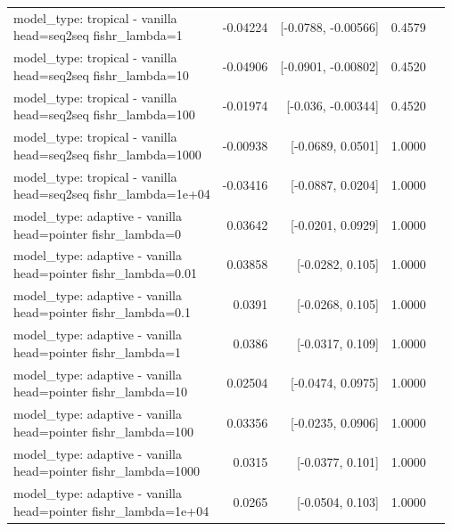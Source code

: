\documentclass[10pt]{article}
\makeatletter
\newcommand{\stackcell}[1]{\begin{tabular}[t]{@{}l@{}}#1\end{tabular}}
\makeatother
\begin{document}
{\begin{longtable}{lrrrl}
\stackcell{model\_type: tropical - vanilla\\\footnotesize head=seq2seq fishr\_lambda=1 } & -0.04224 & [-0.0788, -0.00566] & 0.4579 & \\
\stackcell{model\_type: tropical - vanilla\\\footnotesize head=seq2seq fishr\_lambda=10 } & -0.04906 & [-0.0901, -0.00802] & 0.4520 & \\
\stackcell{model\_type: tropical - vanilla\\\footnotesize head=seq2seq fishr\_lambda=100 } & -0.01974 & [-0.036, -0.00344] & 0.4520 & \\
\stackcell{model\_type: tropical - vanilla\\\footnotesize head=seq2seq fishr\_lambda=1000 } & -0.00938 & [-0.0689, 0.0501] & 1.0000 & \\
\stackcell{model\_type: tropical - vanilla\\\footnotesize head=seq2seq fishr\_lambda=1e+04 } & -0.03416 & [-0.0887, 0.0204] & 1.0000 & \\
\stackcell{model\_type: adaptive - vanilla\\\footnotesize head=pointer fishr\_lambda=0 } & 0.03642 & [-0.0201, 0.0929] & 1.0000 & \\
\stackcell{model\_type: adaptive - vanilla\\\footnotesize head=pointer fishr\_lambda=0.01 } & 0.03858 & [-0.0282, 0.105] & 1.0000 & \\
\stackcell{model\_type: adaptive - vanilla\\\footnotesize head=pointer fishr\_lambda=0.1 } & 0.0391 & [-0.0268, 0.105] & 1.0000 & \\
\stackcell{model\_type: adaptive - vanilla\\\footnotesize head=pointer fishr\_lambda=1 } & 0.0386 & [-0.0317, 0.109] & 1.0000 & \\
\stackcell{model\_type: adaptive - vanilla\\\footnotesize head=pointer fishr\_lambda=10 } & 0.02504 & [-0.0474, 0.0975] & 1.0000 & \\
\stackcell{model\_type: adaptive - vanilla\\\footnotesize head=pointer fishr\_lambda=100 } & 0.03356 & [-0.0235, 0.0906] & 1.0000 & \\
\stackcell{model\_type: adaptive - vanilla\\\footnotesize head=pointer fishr\_lambda=1000 } & 0.0315 & [-0.0377, 0.101] & 1.0000 & \\
\stackcell{model\_type: adaptive - vanilla\\\footnotesize head=pointer fishr\_lambda=1e+04 } & 0.0265 & [-0.0504, 0.103] & 1.0000 & \\

\end{longtable}}
\end{document}
